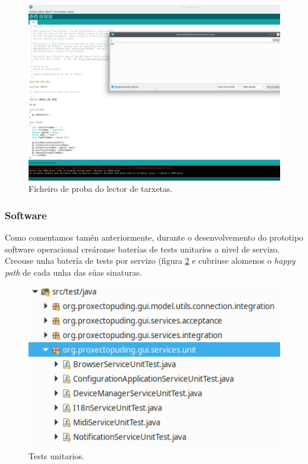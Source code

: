   \begin{figure}[htbp]
   \centering
   \includegraphics[scale=0.5,angle=90,keepaspectratio=true]{./imagenes/resultado-test-lector-tarxetas.png}
   \caption{Ficheiro de proba do lector de tarxetas.}
   \label{figura:ResultadoTestUnitarioLectorTarxetas}
  \end{figure}
  
  \subsubsection{Software}
  
  Como comentamos tamén anteriormente, durante o desenvolvemento do prototipo
  software operacional creáronse baterías de tests unitarios a nivel de
  servizo. \\
  
  Creouse unha batería de tests por servizo (figura \ref{figura:TestsUnitarios}
  e cubriuse alomenos o \textit{happy path} de cada unha das súas sinaturas. \\
  
  \begin{figure}[htbp]
   \centering
   \includegraphics[scale=0.8,keepaspectratio=true]{./imagenes/tests-unitarios.png}
   \caption{Tests unitarios.}
   \label{figura:TestsUnitarios}
  \end{figure}
  
